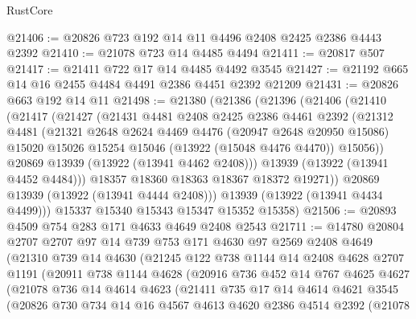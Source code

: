 \begin{lexlean}{RustCore}
\begin{coremodule}
@21406 := @20826 @723 @192 @14 @11 @4496 @2408 @2425 @2386 @4443 @2392
@21410 := @21078 @723 @14 @4485 @4494
@21411 := @20817 @507
@21417 := @21411 @722 @17 @14 @4485 @4492 @3545
@21427 := @21192 @665 @14 @16 @2455 @4484 @4491 @2386 @4451 @2392 @21209
@21431 := @20826 @663 @192 @14 @11
@21498 := @21380
    (@21386
      (@21396
        (@21406
          (@21410
            (@21417
              (@21427
                (@21431
                  @4481
                  @2408
                  @2425
                  @2386
                  @4461
                  @2392
                  (@21312
                    @4481
                    (@21321
                      @2648
                      @2624
                      @4469
                      @4476
                      (@20947 @2648 @20950 @15086)
                      @15020
                      @15026
                      @15254
                      @15046
                      (@13922 (@15048 @4476 @4470))
                      @15056))
                  @20869
                  @13939
                  (@13922 (@13941 @4462 @2408)))
                @13939
                (@13922 (@13941 @4452 @4484)))
              @18357
              @18360
              @18363
              @18367
              @18372
              @19271))
          @20869
          @13939
          (@13922 (@13941 @4444 @2408)))
        @13939
        (@13922 (@13941 @4434 @4499)))
      @15337
      @15340
      @15343
      @15347
      @15352
      @15358)
@21506 := @20893 @4509 @754 @283 @171 @4633 @4649 @2408 @2543
@21711 := @14780
    @20804
    @2707
    @2707
    @97
    @14
    @739
    @753
    @171
    @4630
    @97
    @2569
    @2408
    @4649
    (@21310
      @739
      @14
      @4630
      (@21245
        @122
        @738
        @1144
        @14
        @2408
        @4628
        @2707
        @1191
        (@20911
          @738
          @1144
          @4628
          (@20916
            @736
            @452
            @14
            @767
            @4625
            @4627
            (@21078
              @736
              @14
              @4614
              @4623
              (@21411
                @735
                @17
                @14
                @4614
                @4621
                @3545
                (@20826
                  @730
                  @734
                  @14
                  @16
                  @4567
                  @4613
                  @4620
                  @2386
                  @4514
                  @2392
                  (@21078

\end{coremodule}
\end{lexlean}
